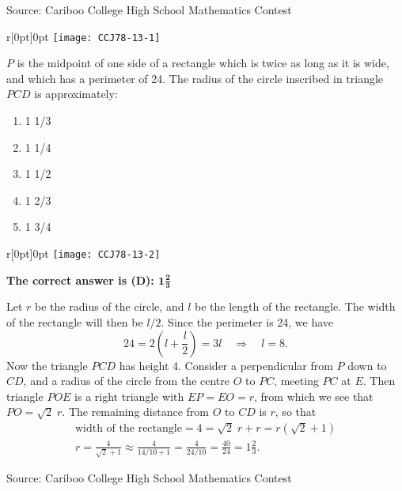 \documentclass{article}
\begin{document}
\scriptsize
Source: Cariboo College High School Mathematics Contest

\normalsize
\begin{wrapfigure}{r}[0pt]{0pt}
	\texttt{[image: CCJ78-13-1]}
\end{wrapfigure}
$P$ is the midpoint of one side of a rectangle which is twice as long as it is wide, and which has a perimeter of 24. The radius of the circle inscribed in triangle $PCD$ is approximately:

\begin{enumerate}[noitemsep,topsep=0mm,leftmargin=*,widest=D,label=\Alph*)]
	\item 1 1/3
	\item 1 1/4
	\item 1 1/2
	\item 1 2/3
	\item 1 3/4
\end{enumerate}

\begin{wrapfigure}[7]{r}[0pt]{0pt}
	\texttt{[image: CCJ78-13-2]}
\end{wrapfigure}
\textbf{The correct answer is (D): $\mathbf{1\frac{2}{3}}$}

Let $r$ be the radius of the circle, and $l$ be the length of the rectangle. The width of the rectangle will then be $l/2$. Since the perimeter is 24, we have
\[
24 = 2 \left(l+\frac{l}{2}\right) = 3l \quad \Longrightarrow \quad l=8.
\]
Now the triangle $PCD$ has height 4. Consider a perpendicular from $P$ down to $CD$, and a radius of the circle from the centre $O$ to $PC$, meeting $PC$ at $E$. Then triangle $POE$ is a right triangle with $EP=EO=r$, from which we see that $PO=\sqrt{2}\;r$. The remaining distance from $O$ to $CD$ is $r$, so that
\begin{align*}
\text{width of the rectangle} = 4 = \sqrt{2}\;r+r = r(\sqrt{2}+1)\\
r = \frac{4}{\sqrt{2}+1} \approx \frac{4}{14/10+1} = \frac{4}{24/10} = \frac{40}{24} = 1 \frac{2}{3}.
\end{align*}

\vskip 1.5cm


\scriptsize
Source: Cariboo College High School Mathematics Contest
\end{document}
